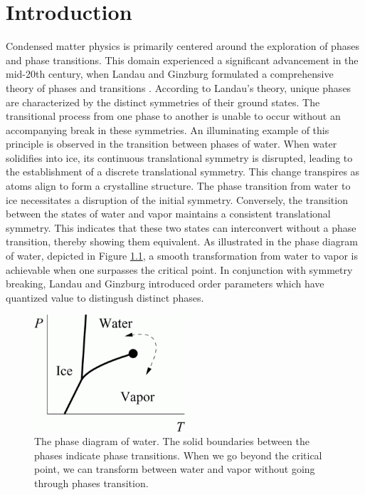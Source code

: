 \chapter{Introduction}
\label{ch1}
Condensed matter physics is primarily centered around the exploration of phases and phase transitions. This domain experienced a significant advancement in the mid-20th century, when Landau and Ginzburg formulated a comprehensive theory of phases and transitions \cite{Landau:1937obd,Ginzburg:1950sr}. According to Landau's theory, unique phases are characterized by the distinct symmetries of their ground states. The transitional process from one phase to another is unable to occur without an accompanying break in these symmetries.
An illuminating example of this principle is observed in the transition between phases of water. When water solidifies into ice, its continuous translational symmetry is disrupted, leading to the establishment of a discrete translational symmetry. This change transpires as atoms align to form a crystalline structure. The phase transition from water to ice necessitates a disruption of the initial symmetry. Conversely, the transition between the states of water and vapor maintains a consistent translational symmetry. This indicates that these two states can interconvert without a phase transition, thereby showing them equivalent. As illustrated in the phase diagram of water, depicted in Figure \ref{fig:water}, a smooth transformation from water to vapor is achievable when one surpasses the critical point. In conjunction with symmetry breaking, Landau and Ginzburg introduced order parameters which have quantized value to distingush distinct phases.

\begin{figure}[h]
    \centering
    \includegraphics[width =0.5\textwidth]{images/water.png}
    \caption{The phase diagram of water. The solid boundaries between the phases indicate phase transitions. When we go beyond the critical point, we can transform between water and vapor without going through phases transition. }
    \label{fig:water}
\end{figure}

